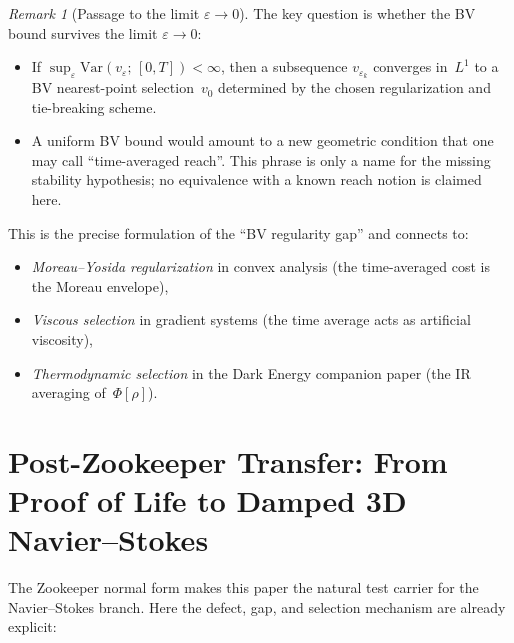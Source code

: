 \documentclass[12pt,a4paper]{article}
\theoremstyle{definition}
\theoremstyle{plain}
\theoremstyle{remark}
\newtheorem{remark}[definition]{Remark}
\newcommand{\Var}{\mathrm{Var}}
\begin{document}
\begin{remark}[Passage to the limit \texorpdfstring{$\varepsilon \to 0$}{epsilon to 0}]
\label{rem:epsilon-limit}
The key question is whether the BV bound survives the limit
$\varepsilon \to 0$:
\begin{itemize}
\item If\; $\sup_\varepsilon \Var(v_\varepsilon;\,[0,T]) < \infty$,
  then a subsequence $v_{\varepsilon_k}$ converges in~$L^1$ to a BV
  nearest-point selection~$v_0$ determined by the chosen
  regularization and tie-breaking scheme.
\item A uniform BV bound would amount to a new geometric condition
  that one may call ``time-averaged reach''.  This phrase is only a
  name for the missing stability hypothesis; no equivalence with a
  known reach notion is claimed here.
\end{itemize}
This is the precise formulation of the ``BV regularity gap'' and
connects to:
\begin{itemize}
\item \emph{Moreau--Yosida regularization} in convex analysis (the
  time-averaged cost is the Moreau envelope),
\item \emph{Viscous selection} in gradient systems (the time average
  acts as artificial viscosity),
\item \emph{Thermodynamic selection} in the Dark Energy companion
  paper (the IR averaging of~$\Phi[\rho]$).
\end{itemize}
\end{remark}


\section{Post-Zookeeper Transfer: From Proof of Life to Damped 3D Navier--Stokes}
\label{sec:zookeeper-ldi-transfer}

The Zookeeper normal form makes this paper the natural test carrier for
the Navier--Stokes branch.  Here the defect, gap, and selection mechanism
are already explicit:
\end{document}
